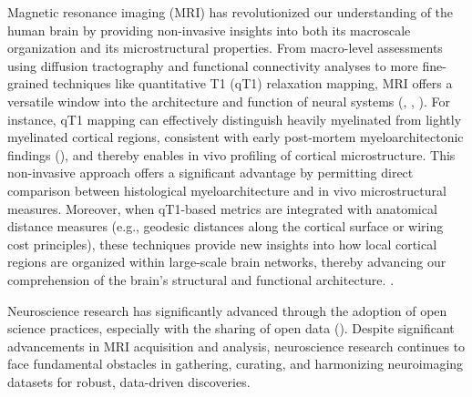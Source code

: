 Magnetic resonance imaging (MRI) has revolutionized our understanding of the human brain by providing 
non-invasive insights into both its macroscale organization and its microstructural properties. From 
macro-level assessments using diffusion tractography and functional connectivity analyses to more 
fine-grained techniques like quantitative T1 (qT1) relaxation mapping, MRI offers a versatile window 
into the architecture and function of neural systems (\cite{sereno2013mapping}, \cite{park2013structural},
\cite{honey2009predicting}).
For instance, qT1 mapping can effectively distinguish heavily myelinated from lightly myelinated cortical 
regions, consistent with early post-mortem myeloarchitectonic findings (\cite{nieuwenhuys2013myeloarchitectonic, shams2019comparison}), 
and thereby enables in vivo profiling of cortical microstructure. This non-invasive approach offers a 
significant advantage by permitting direct comparison between histological myeloarchitecture and in vivo 
microstructural measures.
Moreover, when qT1-based metrics are integrated with anatomical distance measures (e.g., geodesic 
distances along the cortical surface or wiring cost principles), these techniques provide new 
insights into how local cortical regions are organized within large-scale brain networks, 
thereby advancing our comprehension of the brain's structural and functional architecture.
\cite{hong2018multidimensional, ecker2013intrinsic, paquola2020multi}.

Neuroscience research has significantly advanced through the adoption of open science practices, especially 
with the sharing of open data (\cite{snoek2021amsterdam, van2013wu, miller2016multimodal, di2014autism}).
Despite significant advancements in MRI acquisition and analysis, neuroscience research continues to face 
fundamental obstacles in gathering, curating, and harmonizing neuroimaging datasets for robust, 
data-driven discoveries. 

